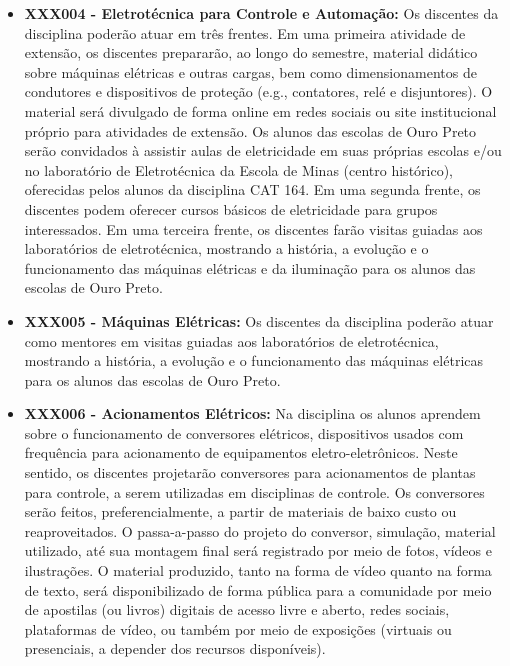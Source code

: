 \documentclass[
	12pt,				%
	openright,			%
	oneside,			%
	a4paper,			%
	english,			%
	brazil				%
	]{abntex2}
\begin{document}
\begin{itemize}
    \item \textbf{XXX004 - Eletrotécnica para Controle e Automação:} Os discentes da disciplina poderão atuar em três frentes. Em uma primeira atividade de extensão, os discentes prepararão, ao longo do semestre, material didático sobre máquinas elétricas e outras cargas, bem como dimensionamentos de condutores e dispositivos de proteção (e.g., contatores, relé e disjuntores). O material será divulgado de forma online em redes sociais ou site institucional próprio para atividades de extensão. Os alunos das escolas de Ouro Preto serão convidados à assistir aulas de eletricidade em suas próprias escolas e/ou no laboratório de Eletrotécnica da Escola de Minas (centro histórico), oferecidas pelos alunos da disciplina CAT 164. Em uma segunda frente, os discentes podem oferecer cursos básicos de eletricidade para grupos interessados. Em uma terceira frente, os discentes farão visitas guiadas aos laboratórios de eletrotécnica, mostrando a história, a evolução e o funcionamento das máquinas elétricas e da iluminação para os alunos das escolas de Ouro Preto.

    \item \textbf{XXX005 - Máquinas Elétricas:} Os discentes da disciplina poderão atuar como mentores em visitas guiadas aos laboratórios de eletrotécnica, mostrando a história, a evolução e o funcionamento das máquinas elétricas para os alunos das escolas de Ouro Preto.

    \item \textbf{XXX006 - Acionamentos Elétricos:} Na disciplina os alunos aprendem sobre o funcionamento de conversores elétricos, dispositivos usados com frequência para acionamento de equipamentos eletro-eletrônicos. Neste sentido, os discentes projetarão conversores para acionamentos de plantas para controle, a serem utilizadas em disciplinas de controle. Os conversores serão feitos, preferencialmente, a partir de materiais de baixo custo ou reaproveitados. O passa-a-passo do  projeto do conversor, simulação, material utilizado, até sua montagem final será registrado por meio de fotos, vídeos e ilustrações. O material produzido, tanto na forma de vídeo quanto na forma de texto, será disponibilizado de forma pública para a comunidade por meio de apostilas (ou livros) digitais de acesso livre e aberto, redes sociais, plataformas de vídeo, ou também por meio de exposições (virtuais ou presenciais, a depender dos recursos disponíveis).


\end{itemize}
\end{document}
